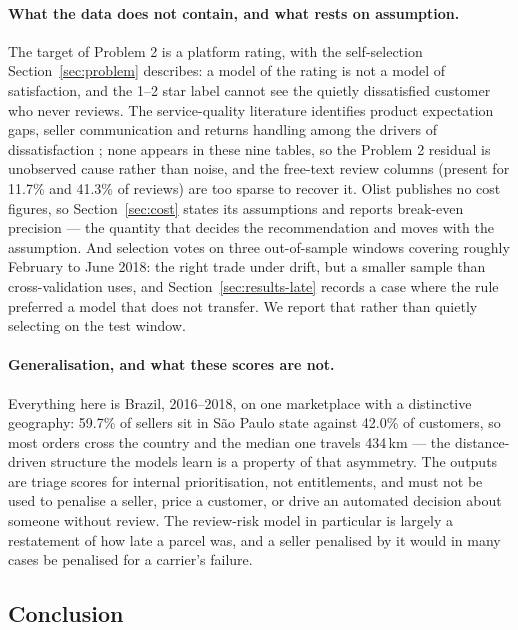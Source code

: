 \paragraph{What the data does not contain, and what rests on assumption.}
The target of Problem 2 is a platform rating, with the self-selection
Section~\ref{sec:problem} describes: a model of the rating is not a model of
satisfaction, and the 1--2 star label cannot see the quietly dissatisfied
customer who never reviews. The service-quality literature identifies product
expectation gaps, seller communication and returns handling among the drivers
of dissatisfaction \citep{parasuraman2005esqual, rao2011elsq}; none appears in
these nine tables, so the Problem 2 residual is unobserved cause rather than
noise, and the free-text review columns (present for 11.7\% and 41.3\% of
reviews) are too sparse to recover it. Olist publishes no cost figures, so Section~\ref{sec:cost} states its
assumptions and reports break-even precision --- the quantity that decides the
recommendation and moves with the assumption. And selection votes on three
out-of-sample windows covering roughly February to June 2018: the right trade
under drift, but a smaller sample than cross-validation uses, and
Section~\ref{sec:results-late} records a case where the rule preferred a model
that does not transfer. We report that rather than quietly selecting on the test
window.

\paragraph{Generalisation, and what these scores are not.}
Everything here is Brazil, 2016--2018, on one marketplace with a distinctive
geography: 59.7\% of sellers sit in São Paulo state against 42.0\% of customers,
so most orders cross the country and the median one travels 434\,km --- the
distance-driven structure the models learn is a property of that asymmetry. The
outputs are triage scores for internal prioritisation, not entitlements, and must
not be used to penalise a seller, price a customer, or drive an automated
decision about someone without review. The review-risk model in particular is
largely a restatement of how late a parcel was, and a seller penalised by it
would in many cases be penalised for a carrier's failure.

\subsection*{Conclusion}

